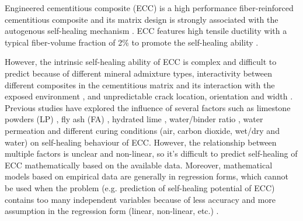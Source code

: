 \documentclass[11pt]{article}
\begin{document}
	
	Engineered cementitious composite (ECC) is a high performance fiber-reinforced cementitious composite and its matrix design is strongly associated with the autogenous self-healing mechanism \cite{kamada2000effects}. ECC features high tensile ductility with a typical fiber-volume fraction of 2\%  \cite{li1998innovations,ozbay2013self} to promote the self-healing ability \cite{tang2015robust}. 
	
	However, the intrinsic self-healing ability of ECC is complex and difficult to predict because of different mineral admixture types, interactivity between different composites in the cementitious matrix and its interaction with the exposed environment \cite{wu2012review}, and unpredictable crack location, orientation and width \cite{huang2013characterization}. Previous studies have explored the influence of several factors such as limestone powders (LP) \cite{suleiman2019visualization,zhou2008developing}, fly ash (FA) \cite{li2007self,zhang2014investigating}, hydrated lime \cite{yildirim2014influence}, water/binder ratio \cite{yang2005self}, water permeation \cite{sahmaran2007transport} and different curing conditions (air, carbon dioxide, wet/dry and water) \cite{qian2010influence} on self-healing behaviour of ECC. However, the relationship between multiple factors is unclear and non-linear, so it’s difficult to predict self-healing of ECC mathematically based on the available data. Moreover, mathematical models based on empirical data are generally in regression forms, which cannot be used when the problem (e.g. prediction of self-healing potential of ECC) contains too many independent variables because of less accuracy and more assumption in the regression form (linear, non-linear, etc.) \cite{alshihri2009neural}.
	
\end{document}
